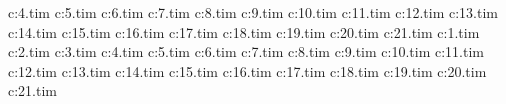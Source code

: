 c:\wipeout\textures\tunruf4.tim
c:\wipeout\textures\tunruf5.tim
c:\wipeout\textures\tunruf6.tim
c:\wipeout\textures\tunruf7.tim
c:\wipeout\textures\tunruf8.tim
c:\wipeout\textures\tunruf9.tim
c:\wipeout\textures\tunruf10.tim
c:\wipeout\textures\tunruf11.tim
c:\wipeout\textures\tunruf12.tim
c:\wipeout\textures\tunruf13.tim
c:\wipeout\textures\tunruf14.tim
c:\wipeout\textures\tunruf15.tim
c:\wipeout\textures\tunruf16.tim
c:\wipeout\textures\tunruf17.tim
c:\wipeout\textures\tunruf18.tim
c:\wipeout\textures\tunruf19.tim
c:\wipeout\textures\tunruf20.tim
c:\wipeout\textures\tunruf21.tim
c:\wipeout\textures\tunwal1.tim
c:\wipeout\textures\tunwal2.tim
c:\wipeout\textures\tunwal3.tim
c:\wipeout\textures\tunwal4.tim
c:\wipeout\textures\tunwal5.tim
c:\wipeout\textures\tunwal6.tim
c:\wipeout\textures\tunwal7.tim
c:\wipeout\textures\tunwal8.tim
c:\wipeout\textures\tunwal9.tim
c:\wipeout\textures\tunwal10.tim
c:\wipeout\textures\tunwal11.tim
c:\wipeout\textures\tunwal12.tim
c:\wipeout\textures\tunwal13.tim
c:\wipeout\textures\tunwal14.tim
c:\wipeout\textures\tunwal15.tim
c:\wipeout\textures\tunwal16.tim
c:\wipeout\textures\tunwal17.tim
c:\wipeout\textures\tunwal18.tim
c:\wipeout\textures\tunwal19.tim
c:\wipeout\textures\tunwal20.tim
c:\wipeout\textures\tunwal21.tim

